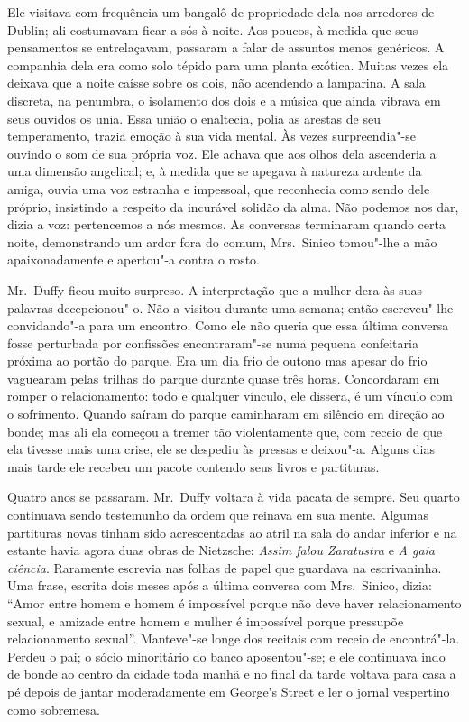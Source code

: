 Ele visitava com frequência um bangalô de propriedade dela nos arredores de
Dublin; ali costumavam ficar a sós à noite.  Aos poucos, à medida que seus
pensamentos se entrelaçavam, passaram a falar de assuntos menos genéricos.  A
companhia dela era como solo tépido para uma planta exótica.  Muitas vezes ela
deixava que a noite caísse sobre os dois, não acendendo a lamparina.  A sala
discreta, na penumbra, o isolamento dos dois e a música que ainda vibrava em
seus ouvidos os unia.  Essa união o enaltecia, polia as arestas de seu
temperamento, trazia emoção à sua vida mental.  Às vezes surpreendia"-se ouvindo
o som de sua própria voz.  Ele achava que aos olhos dela ascenderia a uma
dimensão angelical; e, à medida que se apegava à natureza ardente da amiga,
ouvia uma voz estranha e impessoal, que reconhecia como sendo dele próprio,
insistindo a respeito da incurável solidão da alma.  Não podemos nos dar, dizia
a voz: pertencemos a nós mesmos.  As conversas terminaram quando certa noite,
demonstrando um ardor fora do comum, Mrs.~Sinico tomou"-lhe a mão
apaixonadamente e apertou"-a contra o rosto.

Mr.~Duffy ficou muito surpreso.  A interpretação que a mulher dera às suas
palavras decepcionou"-o.  Não a visitou durante uma semana; então escreveu"-lhe
convidando"-a para um encontro.  Como ele não queria que essa última conversa
fosse perturbada por confissões encontraram"-se numa pequena confeitaria próxima
ao portão do parque.  Era um dia frio de outono mas apesar do frio vaguearam
pelas trilhas do parque durante quase três horas.  Concordaram em romper o
relacionamento: todo e qualquer vínculo, ele dissera, é um vínculo com o
sofrimento.  Quando saíram do parque caminharam em silêncio em direção ao
bonde; mas ali ela começou a tremer tão violentamente que, com receio de que
ela tivesse mais uma crise, ele se despediu às pressas e deixou"-a.  Alguns dias
mais tarde ele recebeu um pacote contendo seus livros e partituras.

Quatro anos se passaram.  Mr.~Duffy voltara à vida pacata de sempre.  Seu
quarto continuava sendo testemunho da ordem que reinava em sua mente.  Algumas
partituras novas tinham sido acrescentadas ao atril na sala do andar inferior e
na estante havia agora duas obras de Nietzsche: \textit{Assim falou
Zaratustra} e \textit{A gaia ciência}.  Raramente escrevia nas folhas
de papel que guardava na escrivaninha.  Uma frase, escrita dois meses após a
última conversa com Mrs.~Sinico, dizia: “Amor entre homem e homem é impossível
porque não deve haver relacionamento sexual, e amizade entre homem e mulher é
impossível porque pressupõe relacionamento sexual”.  Manteve"-se longe dos
recitais com receio de encontrá"-la.  Perdeu o pai; o sócio minoritário do banco
aposentou"-se; e ele continuava indo de bonde ao centro da cidade toda manhã e
no final da tarde voltava para casa a pé depois de jantar moderadamente em
George’s Street e ler o jornal vespertino como sobremesa.

